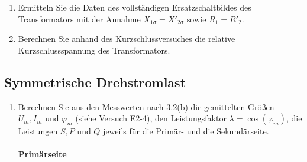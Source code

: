 \begin{enumerate}[label=\alph*)]
	\item Ermitteln Sie die Daten des vollständigen Ersatzschaltbildes des Transformators
	      mit der Annahme $X_{1\sigma} = X'_{2\sigma} \text{ sowie } R_1 = R'_2$.

	\item Berechnen Sie anhand des Kurzschlussversuches die relative Kurzschlussspannung
	      des Transformators.

\end{enumerate}
\subsection{Symmetrische Drehstromlast}
\begin{enumerate}[label=\alph*)]

	\item Berechnen Sie aus den Messwerten nach 3.2(b) die gemittelten Größen $U_m, I_m
		      \text{ und } \varphi_m$ (siehe Versuch E2-4), den Leistungsfaktor $\lambda =
		      \cos(\varphi_m)$, die Leistungen $S, P \text{ und } Q$ jeweils für die Primär-
	      und die Sekundärseite.\\ \ \\

	      \textbf{Primärseite}\\ \ \\



\end{enumerate}
